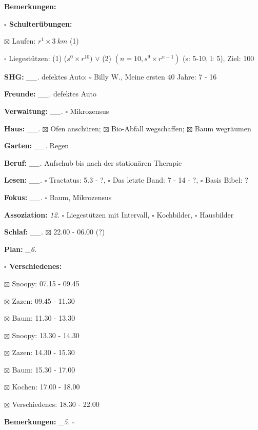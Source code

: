 \documentclass[10pt,a4paper]{article}
\newcommand\prop[1] {{\color {alizarin} {\bf #1}}}        %
\newcommand\draf[1] {{\color {amber(sae/ece)} {\bf #1}}}  %
\newcommand\mand[1] {{\color {burntorange} {\bf #1}}}     %
\newcommand\topspace{\vskip -15pt \hskip 20pt}
\newcommand\bottomspace{\vskip 4pt}
\newcommand\n[1] { {\sl #1.} \hskip 5pt }
\begin{document}
\begin{mdframed}[style=daystyle]
\begin{labeling}{{\mand {Bemerkungen:}}}
\begin{minipage}{0.75\textwidth}
\begin{labeling}{\prop {$\square$ {Schulterübungen:}}}
      \item[$\boxtimes$ Laufen:]          $r^1 \times 3\ km$ (1)
      \item[$\square$ Liegestützen:]    (1) ($s^0 \times r^{10})$ $\vee$ (2)
          $(n=10, s^9 \times r^{n-1})$ (s: 5-10, l: 5), Ziel: 100
      \end{labeling}
    \end{minipage}
    \bottomspace        
  \item[{\mand {SHG:}}]          \n{\_\_} defektes Auto: $\square$ Billy W., Meine ersten 40 Jahre: 7 - 16
  \item[{\mand {Freunde:}}]      \n{\_\_} defektes Auto
  \item[{\mand {Verwaltung:}}]   \n{\_\_} $\square$ Mikrozensus
  \item[{\mand {Haus:}}]         \n{\_\_} $\boxtimes$ Ofen anschüren;
    $\boxtimes$ Bio-Abfall wegschaffen; $\boxtimes$ Baum wegräumen
  \item[{\mand {Garten:}}]       \n{\_\_} Regen
  \item[{\mand {Beruf:}}]        \n{\_\_} Aufschub bis nach der stationären Therapie
  \item[{\mand {Lesen:}}]        \n{\_\_} $\square$ Tractatus: 5.3 - ?,
      $\square$ Das letzte Band: 7 - 14 - ?, $\square$ Basis Bibel: ?
  \item[{\mand {Fokus:}}]        \n{\_\_} $\square$ Baum, Mikrozensus
  \item[{\mand {Assoziation:}}]    \n{12} $\square$ Liegestützen mit Intervall,
    $\square$ Kochbilder, $\square$ Hausbilder
  \item[{\mand {Schlaf:}}]       \n{\_\_} $\boxtimes$ 22.00 - 06.00 (?)
  \item[{\mand {Plan:}}]          \n{\_6}
    \topspace
    \begin{minipage}{0.75\textwidth}  
      \begin{labeling}{\prop {$\square$ {Verschiedenes:}}} 
        \setlength\itemsep{-3pt}
      \item[$\boxtimes$ Snoopy:]  07.15 - 09.45
      \item[$\boxtimes$ Zazen:]   09.45 - 11.30
      \item[$\boxtimes$ Baum:]    11.30 - 13.30
      \item[$\boxtimes$ Snoopy:]  13.30 - 14.30
      \item[$\boxtimes$ Zazen:]   14.30 - 15.30
      \item[$\boxtimes$ Baum:]    15.30 - 17.00
      \item[$\boxtimes$ Kochen:]  17.00 - 18.00
      \item[$\boxtimes$ Verschiedenes:]  18.30 - 22.00
      \end{labeling}
    \end{minipage}
    \bottomspace
  \item[{\mand {Bemerkungen:}}]   \n{\_5} {\draf {$\square$}}
  \end{labeling}
    

\end{mdframed}
\end{document}
